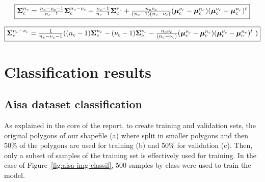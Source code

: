 \documentclass[a4paper,11pt,DIV=16,abstracton]{scrartcl}
\begin{document}
        \begin{equation}
            \fbox{$\boldsymbol{\Sigma}_c^{n_c} = \frac{n_c-\nu_c-1}{n_c-1} \boldsymbol{\Sigma}_c^{n_c-\nu_c} + \frac{\nu_c-1}{n_c-1} \boldsymbol{\Sigma}_c^{\nu_c} + \frac{n_c \nu_c}{(n_c-1)(n_c-\nu_c)} (\boldsymbol{\mu}_c^{\nu_c}-\boldsymbol{\mu}_c^{n_c})(\boldsymbol{\mu}_c^{\nu_c}-\boldsymbol{\mu}_c^{n_c})^t$}
        \end{equation}

        \begin{equation}
            \fbox{$\boldsymbol{\Sigma}_c^{n_c-\nu_c} = \frac{1}{n_c-\nu_c-1} ( (n_c-1) \boldsymbol{\Sigma}_c^{n_c} - (\nu_c-1) \boldsymbol{\Sigma}_c^{\nu_c} - \frac{n_c \nu_c}{(n_c-\nu_c)} (\boldsymbol{\mu}_c^{\nu_c}-\boldsymbol{\mu}_c^{n_c})(\boldsymbol{\mu}_c^{\nu_c}-\boldsymbol{\mu}_c^{n_c})^t$ )}
        \end{equation}


\section{Classification results}

    \subsection{Aisa dataset classification}
    \label{app:classif-aisa}

    As explained in the core of the report, to create training and validation sets, the original polygons of our shapefile (a) where split in smaller polygons and then 50\% of the polygons are used for training (b) and 50\% for validation (c). Then, only a subset of samples of the training set is effectively used for training. In the case of Figure~\ref{fig:aisa-img-classif}, 500 samples by class were used to train the model.
\end{document}
